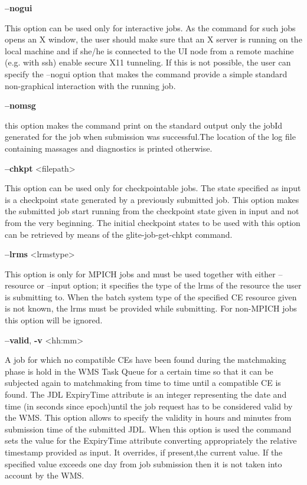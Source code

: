 {\textbf{--nogui}

This option can be used only for interactive jobs. As the command for such jobs opens an X window, the user should make sure that an X server is running on the local machine and if she/he is connected to the UI node from a remote machine (e.g. with ssh) enable secure X11 tunneling.
If this is not possible, the user can specify the --nogui option that makes the command provide a simple standard non-graphical interaction with the running job.

\textbf{--nomsg}

this option makes the command print on the standard output only the jobId generated for the job when submission was successful.The location of the log file containing massages and diagnostics is printed otherwise.

\textbf{--chkpt} <filepath>

This option can be used only for checkpointable jobs. The state specified as input is a checkpoint state generated by a previously submitted job.  This option makes the submitted job start running from the checkpoint state given in input and not from the very beginning.
The initial checkpoint states to be used with this option can be retrieved by means of the glite-job-get-chkpt command.

\textbf{--lrms} <lrmstype>

This option is only for MPICH  jobs and must be used together with either --resource or --input option; it specifies the type of the lrms of the resource the user is submitting to. When the batch system type of the specified CE resource given is not known, the lrms must be provided while submitting. For non-MPICH jobs this option will be ignored.

\textbf{--valid}, \textbf{-v} <hh:mm>

A job for which no compatible CEs have been found during the matchmaking phase is hold in the WMS Task Queue for a certain time so that it can be subjected again to matchmaking from time to time until a compatible CE is found. The JDL ExpiryTime attribute is an integer representing the date and time (in seconds since epoch)until the job request has to be considered valid by the WMS. This option allows to specify the validity in hours and minutes from submission time of the submitted JDL. When this option is used the command sets the value for the ExpiryTime attribute converting appropriately the relative timestamp provided as input. It overrides, if present,the current value. If the specified value exceeds one day from job submission then it is not taken into account by the WMS.

}
